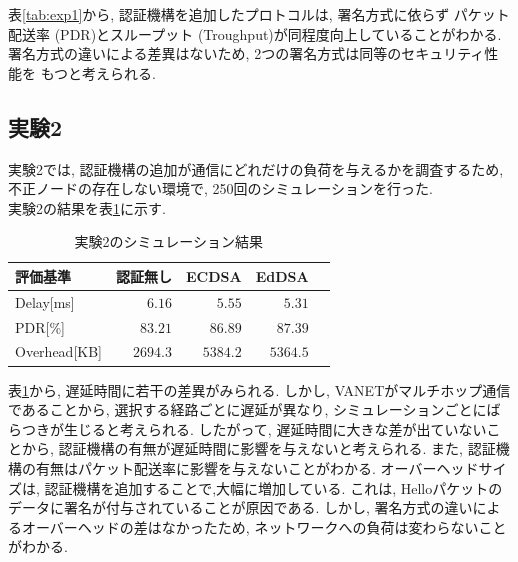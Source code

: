 \documentclass[a4j,9pt,twocolumn]{jsarticle}
\begin{document}
表\ref{tab:exp1}から, 認証機構を追加したプロトコルは, 署名方式に依らず
パケット配送率 (PDR)とスループット (Troughput)が同程度向上していることがわかる. 
署名方式の違いによる差異はないため, 2つの署名方式は同等のセキュリティ性能を
もつと考えられる. 
\smallskip
\subsection{実験2}
\indent 実験2では, 認証機構の追加が通信にどれだけの負荷を与えるかを調査するため, 
不正ノードの存在しない環境で, 250回のシミュレーションを行った. \\
\indent 実験2の結果を表\ref{tab:exp2}に示す. 
\vspace{-3mm}
\begin{table}[h]
    \centering
    \caption{実験2のシミュレーション結果}
    \label{tab:exp2} 
    \begin{tabular}{l|rrrr} \hline
        評価基準 & 認証無し & ECDSA & EdDSA \\ \hline \hline
        Delay[ms] & $6.16$ & $5.55$ & $5.31$ \\
        PDR[\%] & $83.21$ & $86.89$ & $87.39$ \\
        Overhead[KB] & $2694.3$ & $5384.2$ & $5364.5$ \\ \hline
    \end{tabular}
\end{table}

表\ref{tab:exp2}から, 遅延時間に若干の差異がみられる. しかし, VANETがマルチホップ通信であることから, 
選択する経路ごとに遅延が異なり, シミュレーションごとにばらつきが生じると考えられる. したがって, 
遅延時間に大きな差が出ていないことから, 認証機構の有無が遅延時間に影響を与えないと考えられる. 
また, 認証機構の有無はパケット配送率に影響を与えないことがわかる. 
オーバーヘッドサイズは, 認証機構を追加することで,大幅に増加している. これは, Helloパケットの
データに署名が付与されていることが原因である. しかし, 署名方式の違いによるオーバーヘッドの差はなかったため, 
ネットワークへの負荷は変わらないことがわかる.\\
\end{document}
